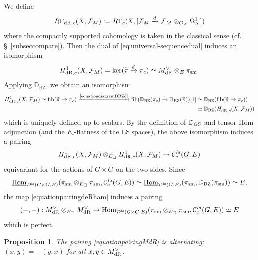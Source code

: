 \documentclass[a4paper,10pt]{amsart}
\theoremstyle{remark}
\theoremstyle{definition}
\theoremstyle{plain}
\newtheorem{proposition}[theorem]{Proposition}
\numberwithin{equation}{section}
\newcommand{\bbD}{{\mathbb D}}
\newcommand{\calC}{{\mathcal C}}
\newcommand{\calD}{{\mathcal D}}
\newcommand{\calF}{{\mathcal F}}
\newcommand{\calO}{{\mathcal O}}
\newcommand{\dR}{{\rm dR}}
\newcommand{\GS}{{\rm GS}}
\newcommand{\Hom}{{\rm Hom}}
\newcommand{\uHom}{\underline{\Hom}}
\newcommand{\la}{{\it la}}
\newcommand{\sm}{{\rm sm}}
\newcommand{\BZ}{\ensuremath{\mathrm{BZ}}}
\begin{document}
We define
\begin{equation}\label{equationdefinitiondeRhamcohomology}
	R\Gamma_{\dR,c}(X,\calF_M):=R\Gamma_c(X, [\calF_M\xrightarrow{d}\calF_M\otimes_{\calO_X}\Omega_X^1])
\end{equation}
where the compactly supported cohomology is taken in the classical sense (cf. \S~\ref{subseccompare}). Then the dual of \eqref{eq:universal-sequencedual} induces an isomorphism
\[H^1_{\dR,c}(X,\calF_M)=\ker(\widetilde{\pi}\xrightarrow{d}\pi_c)\simeq M_{\dR}^{\vee}\otimes_{E}\pi_{\sm}.\]
Applying $\bbD_{\BZ}$, we obtain an isomorphism 
\begin{equation}\label{equationmapDBZHdR}
	\begin{aligned}
		H^1_{\dR,c}(X,\calF_M)\simeq \fib(\widetilde{\pi}\rightarrow \pi_c)\xrightarrow{\text{\eqref{equationdiagramDBZd}}} \fib(\bbD_{\BZ}(\pi_c)\rightarrow \bbD_{\BZ}(\widetilde{\pi}))[1]&\simeq \bbD_{\BZ}(\fib(\widetilde{\pi}\rightarrow \pi_c))\\
		&\simeq \bbD_{\BZ}(H^1_{\dR,c}(X,\calF_M))
	\end{aligned}
\end{equation}
which is uniquely defined up to scalars. By the definition of $\bbD_{\GS}$ and tensor-Hom adjunction (and the $E_{\square}$-flatness of the LS spaces), the above isomorphism induces a pairing 
\begin{equation}\label{equationpairingdeRham}
	H^1_{\dR,c}(X,\calF_M)\otimes_{E_{\square}}H^1_{\dR,c}(X,\calF_M)\to \calC_c^{\la}(G,E)
\end{equation}
equivariant for the actions of $G\times G$ on the two sides. Since 
\[\uHom_{\calD^{\la}(G\times G,E)}(\pi_{\sm}\otimes_{E_{\square}}\pi_{\sm},\calC_c^{\la}(G,E))\simeq \uHom_{\calD^{\la}(G,E)}(\pi_{\sm},\bbD_{\BZ}(\pi_{\sm}))\simeq E,\] 
the map \eqref{equationpairingdeRham} induces a pairing
\begin{equation}\label{equationpairingMdR}
	(-,-):M_{\dR}^{\vee}\otimes_{E_{\square}}M_{\dR}^{\vee}\rightarrow \Hom_{\calD^{\la}(G\times G,E)}(\pi_{\sm}\otimes_{E_{\square}}\pi_{\sm},\calC_c^{\la}(G,E))\simeq E
\end{equation}
which is perfect.
\begin{proposition}\label{propositionalternative}
	The pairing \eqref{equationpairingMdR} is alternating: $(x,y)=-(y,x)$ for all $ x,y\in M_{\dR}^{\vee}$.
\end{proposition}
\end{document}
